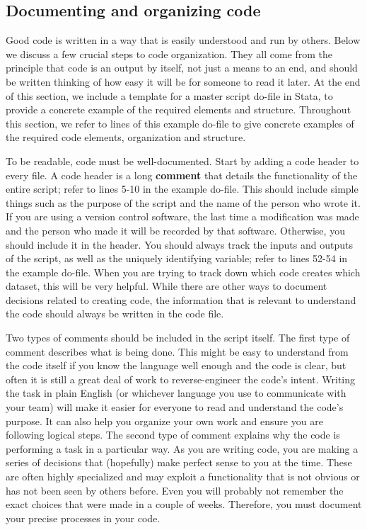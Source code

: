 \subsection{Documenting and organizing code}
Good code is written in a way that is easily understood and run by others.
Below we discuss a few crucial steps to code organization.
They all come from the principle that code is an output by itself,
not just a means to an end,
and should be written thinking of how easy it will be for someone to read it later.
At the end of this section, we include a template for a master script do-file in Stata,
to provide a concrete example of the required elements and structure.
Throughout this section, we refer to lines of this example do-file
to give concrete examples of the required code elements, organization and structure.

To be readable, code must be well-documented.
Start by adding a code header to every file.
A code header is a long \textbf{comment}
that details the functionality of the entire script;
refer to lines 5-10 in the example do-file.
This should include simple things such as
the purpose of the script and the name of the person who wrote it.
If you are using a version control software,
the last time a modification was made and the person who made it will be recorded by that software.
Otherwise, you should include it in the header.
You should always track the inputs and outputs of the script,
as well as the uniquely identifying variable;
refer to lines 52-54 in the example do-file.
When you are trying to track down which code creates which dataset, this will be very helpful.
While there are other ways to document decisions related to creating code,
the information that is relevant to understand the code should always be written in the code file.

Two types of comments should be included in the script itself.
The first type of comment describes what is being done.
This might be easy to understand from the code itself
if you know the language well enough and the code is clear,
but often it is still a great deal of work to reverse-engineer the code's intent.
Writing the task in plain English (or whichever language you use to communicate with your team)
will make it easier for everyone to read and understand the code's purpose.
It can also help you organize your own work and ensure you are following logical steps.
The second type of comment explains why the code is performing a task in a particular way.
As you are writing code, you are making a series of decisions that
(hopefully) make perfect sense to you at the time.
These are often highly specialized and may exploit a functionality
that is not obvious or has not been seen by others before.
Even you will probably not remember the exact choices that were made in a couple of weeks.
Therefore, you must document your precise processes in your code.

